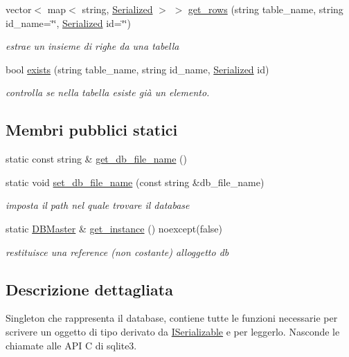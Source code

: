 \begin{DoxyCompactItemize}
vector$<$ map$<$ string, \mbox{\hyperlink{structmm_1_1_serialized}{Serialized}} $>$ $>$ \mbox{\hyperlink{classmm_1_1_d_b_master_aef9d7063da9d7b4e0fb0a20a6d06368f}{get\+\_\+rows}} (string table\+\_\+name, string id\+\_\+name=\char`\"{}\char`\"{}, \mbox{\hyperlink{structmm_1_1_serialized}{Serialized}} id=\char`\"{}\char`\"{})
\begin{DoxyCompactList}\small\item\em estrae un insieme di righe da una tabella \end{DoxyCompactList}\item 
bool \mbox{\hyperlink{classmm_1_1_d_b_master_a16926fd78511ec82ea52da00b84a5d9d}{exists}} (string table\+\_\+name, string id\+\_\+name, \mbox{\hyperlink{structmm_1_1_serialized}{Serialized}} id)
\begin{DoxyCompactList}\small\item\em controlla se nella tabella esiste già un elemento. \end{DoxyCompactList}\end{DoxyCompactItemize}
\subsection*{Membri pubblici statici}
\begin{DoxyCompactItemize}
\item 
static const string \& \mbox{\hyperlink{classmm_1_1_d_b_master_a65586b91e19e610db40ef1d6e81cfd4a}{get\+\_\+db\+\_\+file\+\_\+name}} ()
\item 
static void \mbox{\hyperlink{classmm_1_1_d_b_master_a3346d25779e18ed7ad70eed0d89347e9}{set\+\_\+db\+\_\+file\+\_\+name}} (const string \&db\+\_\+file\+\_\+name)
\begin{DoxyCompactList}\small\item\em imposta il path nel quale trovare il database \end{DoxyCompactList}\item 
static \mbox{\hyperlink{classmm_1_1_d_b_master}{D\+B\+Master}} \& \mbox{\hyperlink{classmm_1_1_d_b_master_a1f3b04e515b1999d3900353c0054f498}{get\+\_\+instance}} () noexcept(false)
\begin{DoxyCompactList}\small\item\em restituisce una reference (non costante) all\textquotesingle{}oggetto db \end{DoxyCompactList}\end{DoxyCompactItemize}


\subsection{Descrizione dettagliata}
Singleton che rappresenta il database, contiene tutte le funzioni necessarie per scrivere un oggetto di tipo derivato da \mbox{\hyperlink{classmm_1_1_i_serializable}{I\+Serializable}} e per leggerlo. Nasconde le chiamate alle A\+PI C di sqlite3. 


